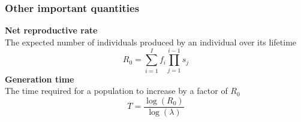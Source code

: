 \documentclass[color=usenames,dvipsnames]{beamer}\usepackage[]{graphicx}\usepackage[]{color}
\begin{document}








\begin{frame}
  \frametitle{Other important quantities}
  {\bf Net reproductive rate \\}
  The expected number of individuals produced by an individual over its lifetime
  \[
    R_0 = \sum_{i=1}^I f_i \prod_{j=1}^{i-1} s_j
  \]
  \pause
  \vfill
  {\bf Generation time \\}
  The time required for a population to increase by a factor of $R_0$
  \[
    T = \frac{\log(R_0)}{\log(\lambda)}
  \]
\end{frame}












\end{document}
